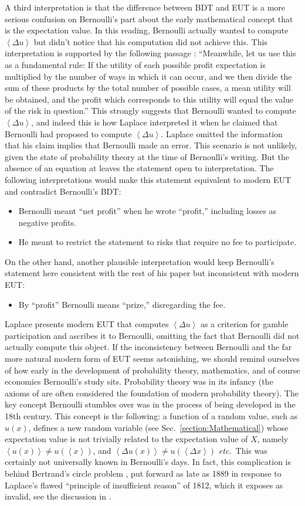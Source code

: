 \documentclass[final]{ectaart}
\newcommand{\etc}{{\it etc.}\ }
\newcommand{\ave}[1]{\left\langle#1 \right\rangle}
\newcommand{\bi}{\begin{itemize}}
\newcommand{\ei}{\end{itemize}}
\newcommand{\secref}[1]{Sec.~\ref{section:#1}}
\newcommand{\Dx}{{\Delta x}}
\newcommand{\Du}{\Delta u}
\theoremstyle{plain}
\begin{document}
A third interpretation is that the difference between BDT and EUT is a more serious confusion on Bernoulli's part about the early mathematical concept that is the expectation value. In this reading,  Bernoulli actually wanted to compute $\ave{\Du}$ but didn't notice that his computation did not achieve this. This interpretation is supported by the following passage \cite[p.~24]{Bernoulli1738}: ``Meanwhile, let us use this as a fundamental rule: If the utility of each possible profit expectation is multiplied by the number of ways in which it can occur, and we then divide the sum of these products by the total number of possible cases, a mean utility will be obtained, and the profit which corresponds to this utility will equal the value of the risk in question.'' This strongly suggests that Bernoulli wanted to compute $\ave{\Du}$, and indeed this is how Laplace interpreted it when he claimed that Bernoulli had proposed to compute $\ave{\Du}$. Laplace omitted the information that his claim implies that Bernoulli made an error. This scenario is not unlikely, given the state of probability theory at the time of Bernoulli's writing. But the absence of an equation at \cite[p.~24]{Bernoulli1738} leaves the statement open to interpretation. The following interpretations would make this statement equivalent to modern EUT and contradict Bernoulli's BDT: 
\bi
\item
Bernoulli meant ``net profit'' when he wrote ``profit,'' including losses as negative profits. 
\item
He meant to restrict the statement to risks that require no fee to participate.
\ei

On the other hand, another plausible interpretation would keep Bernoulli's statement here consistent with the rest of his paper but inconsistent with modern EUT:
\bi
\item
By ``profit'' Bernoulli means ``prize,'' disregarding the fee.
\ei

Laplace presents modern EUT that computes $\ave{\Du}$ as a criterion for gamble participation and ascribes it to Bernoulli, omitting the fact that Bernoulli did not actually compute this object. If the inconsistency between Bernoulli and the far more natural modern form of EUT seems astonishing, we should remind ourselves of how early in the development of probability theory, mathematics, and of course economics Bernoulli's study sits. Probability theory was in its infancy (the axioms of \citet{Kolmogorov1933} are often considered the foundation of modern probability theory). The key concept Bernoulli stumbles over was in the process of being developed in the 18th century. This concept is the following:  a function of a random value, such as $u(x)$, defines a new random variable (see \secref{Mathematical}) whose expectation value is not trivially related to the expectation value of $X$, namely $\ave{u(x)}\neq u(\ave{x})$, and $\ave{\Du(x)}\neq u(\ave\Dx)$ \etc This was certainly not universally known in Bernoulli's days. In fact, this complication is behind Bertrand's circle problem \citep{Bertrand1889}, put forward as late as 1889 in response to Laplace's flawed ``principle of insufficient reason'' of 1812, which it exposes as invalid, see the discussion in \cite[p.~20]{vanKampen2007}.
\end{document}
